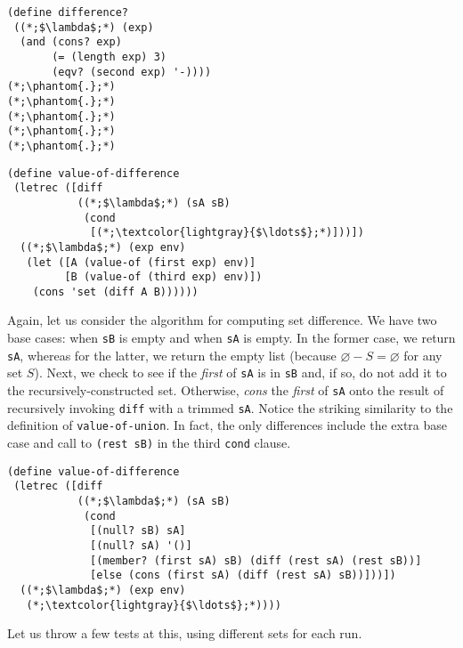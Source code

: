\begin{clrr}[]{}
\begin{lstlisting}[language=MyScheme]
(define difference?
 ((*;$\lambda$;*) (exp)
  (and (cons? exp)
       (= (length exp) 3)
       (eqv? (second exp) '-))))
(*;\phantom{.};*)
(*;\phantom{.};*)
(*;\phantom{.};*)
(*;\phantom{.};*)
(*;\phantom{.};*)
\end{lstlisting}
\tcblower
\begin{lstlisting}[language=MyNLNScheme]
(define value-of-difference
 (letrec ([diff 
           ((*;$\lambda$;*) (sA sB)
            (cond
             [(*;\textcolor{lightgray}{$\ldots$};*)]))])
  ((*;$\lambda$;*) (exp env)
   (let ([A (value-of (first exp) env)]
         [B (value-of (third exp) env)])
    (cons 'set (diff A B))))))
\end{lstlisting}
\end{clrr}

Again, let us consider the algorithm for computing set difference. We have two base cases: when \texttt{sB} is empty and when \texttt{sA} is empty. In the former case, we return \texttt{sA}, whereas for the latter, we return the empty list (because $\varnothing - S = \varnothing$ for any set $S$).
Next, we check to see if the \textit{first} of \texttt{sA} is in \texttt{sB} and, if so, do not add it to the recursively-constructed set. Otherwise, \textit{cons} the \textit{first} of \texttt{sA} onto the result of recursively invoking \texttt{diff} with a trimmed \texttt{sA}. Notice the striking similarity to the definition of \texttt{value-of-union}. In fact, the only differences include the extra base case and call to \texttt{(rest sB)} in the third \texttt{cond} clause.

\begin{cl}[]{}\begin{lstlisting}[language=MyScheme]
(define value-of-difference
 (letrec ([diff 
           ((*;$\lambda$;*) (sA sB)
            (cond
             [(null? sB) sA]
             [(null? sA) '()]
             [(member? (first sA) sB) (diff (rest sA) (rest sB))]
             [else (cons (first sA) (diff (rest sA) sB))]))])
  ((*;$\lambda$;*) (exp env)
   (*;\textcolor{lightgray}{$\ldots$};*))))
\end{lstlisting}\end{cl}

\noindent Let us throw a few tests at this, using different sets for each run.

